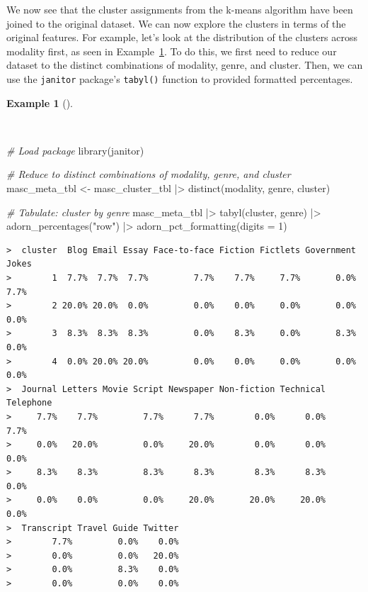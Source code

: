 \documentclass[
  letterpaper,
]{latex/krantz}
\newenvironment{Shaded}{\begin{snugshade}}{\end{snugshade}}
\newcommand{\AttributeTok}[1]{\textcolor[rgb]{0.00,0.00,0.00}{#1}}
\newcommand{\CommentTok}[1]{\textcolor[rgb]{0.00,0.00,0.00}{\textit{#1}}}
\newcommand{\DecValTok}[1]{\textcolor[rgb]{0.00,0.00,0.00}{#1}}
\newcommand{\FunctionTok}[1]{\textcolor[rgb]{0.00,0.00,0.00}{#1}}
\newcommand{\NormalTok}[1]{\textcolor[rgb]{0.00,0.00,0.00}{#1}}
\newcommand{\OtherTok}[1]{\textcolor[rgb]{0.00,0.00,0.00}{#1}}
\newcommand{\SpecialCharTok}[1]{\textcolor[rgb]{0.00,0.00,0.00}{#1}}
\newcommand{\StringTok}[1]{\textcolor[rgb]{0.00,0.00,0.00}{#1}}
\theoremstyle{definition}
\newtheorem{example}{Example}[chapter]
\theoremstyle{remark}
\begin{document}
We now see that the cluster assignments from the k-means algorithm have
been joined to the original dataset. We can now explore the clusters in
terms of the original features. For example, let's look at the
distribution of the clusters across modality first, as seen in
Example~\ref{exm-eda-masc-pos-kmeans-modality}. To do this, we first
need to reduce our dataset to the distinct combinations of modality,
genre, and cluster. Then, we can use the \texttt{janitor} package's
\texttt{tabyl()} function to provided formatted percentages.

\begin{example}[]\protect\hypertarget{exm-eda-masc-pos-kmeans-modality}{}\label{exm-eda-masc-pos-kmeans-modality}

~

\begin{Shaded}
\begin{Highlighting}[]
\CommentTok{\# Load package}
\FunctionTok{library}\NormalTok{(janitor)}

\CommentTok{\# Reduce to distinct combinations of modality, genre, and cluster}
\NormalTok{masc\_meta\_tbl }\OtherTok{\textless{}{-}}
\NormalTok{  masc\_cluster\_tbl }\SpecialCharTok{|\textgreater{}}
  \FunctionTok{distinct}\NormalTok{(modality, genre, cluster)}

\CommentTok{\# Tabulate: cluster by genre}
\NormalTok{masc\_meta\_tbl }\SpecialCharTok{|\textgreater{}}
  \FunctionTok{tabyl}\NormalTok{(cluster, genre) }\SpecialCharTok{|\textgreater{}}
  \FunctionTok{adorn\_percentages}\NormalTok{(}\StringTok{"row"}\NormalTok{) }\SpecialCharTok{|\textgreater{}}
  \FunctionTok{adorn\_pct\_formatting}\NormalTok{(}\AttributeTok{digits =} \DecValTok{1}\NormalTok{)}
\end{Highlighting}
\end{Shaded}

\begin{verbatim}
>  cluster  Blog Email Essay Face-to-face Fiction Fictlets Government Jokes
>        1  7.7%  7.7%  7.7%         7.7%    7.7%     7.7%       0.0%  7.7%
>        2 20.0% 20.0%  0.0%         0.0%    0.0%     0.0%       0.0%  0.0%
>        3  8.3%  8.3%  8.3%         0.0%    8.3%     0.0%       8.3%  0.0%
>        4  0.0% 20.0% 20.0%         0.0%    0.0%     0.0%       0.0%  0.0%
>  Journal Letters Movie Script Newspaper Non-fiction Technical Telephone
>     7.7%    7.7%         7.7%      7.7%        0.0%      0.0%      7.7%
>     0.0%   20.0%         0.0%     20.0%        0.0%      0.0%      0.0%
>     8.3%    8.3%         8.3%      8.3%        8.3%      8.3%      0.0%
>     0.0%    0.0%         0.0%     20.0%       20.0%     20.0%      0.0%
>  Transcript Travel Guide Twitter
>        7.7%         0.0%    0.0%
>        0.0%         0.0%   20.0%
>        0.0%         8.3%    0.0%
>        0.0%         0.0%    0.0%
\end{verbatim}

\end{example}
\end{document}
